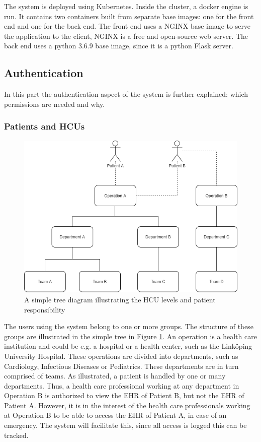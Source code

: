 \documentclass{article}
\begin{document}
The system is deployed using Kubernetes. Inside the cluster, a docker engine is run. It contains two containers built from separate base images: one for the front end and one for the back end. The front end uses a NGINX base image to serve the application to the client, NGINX is a free and open-source web server. The back end uses a python 3.6.9 base image, since it is a python Flask server.


\subsection{Authentication} \label{Authentication}
In this part the authentication aspect of the system is further explained: which permissions are needed and why.

\subsubsection{Patients and HCUs}
\begin{figure}[h]
    \centering
    \includegraphics[scale = 0.45]{departments}
    \caption{A simple tree diagram illustrating the HCU levels and patient responsibility}
    \label{fig:departments}
\end{figure}

The users using the system belong to one or more groups. The structure of these groups are illustrated in the simple tree in Figure \ref{fig:departments}. An operation is a health care institution and could be e.g. a hospital or a health center, such as the Linköping University Hospital. These operations are divided into departments, such as Cardiology,  Infectious Diseases or Pediatrics. These departments are in turn comprised of teams.  
As illustrated, a patient is handled by one or many departments. Thus, a health care professional working at any department in Operation B is authorized to view the EHR of Patient B, but not the EHR of Patient A.
However, it is in the interest of the health care professionals working at Operation B to be able to access the EHR of Patient A, in case of an emergency. The system will facilitate this, since all access is logged this can be tracked.
\end{document}
